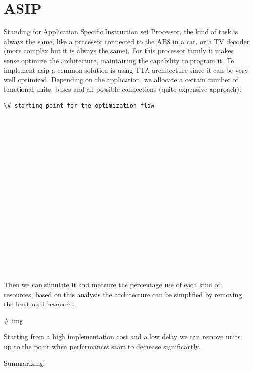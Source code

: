 
\section{ASIP}
Standing for Application Specific Instruction set Processor, the kind of task
is always the same, like a processor connected to the ABS in a car, or a TV
decoder (more complex but it is always the same). For this processor family it
makes sense optimize the architecture, maintaining the capability to program
it.
To implement asip a common solution is using TTA architecture since it can be
very well optimized.
Depending on the application, we allocate a certain number of functional units,
buses and all possible connections (quite expensive approach):
\begin{verbatim}
\# starting point for the optimization flow


















\end{verbatim}
Then we can simulate it and measure the percentage use of each kind of
resources, based on this analysis the architecture can be simplified by
removing the least used resources.

\# img

Starting from a high implementation cost and a low delay we can remove units up
to the point when performances start to decrease significantly.

Summarizing:

